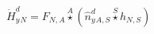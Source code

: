\documentclass[border=2pt]{standalone}
\begin{document}
${{\dot{H}^d_y}}{_{N}}={{F}}{_{N, A}} \stackrel{A}{\star} \left({{\hat{n}^{d}_y}}{_{A, S}} \stackrel{S}{\star} {h}{_{N, S}}\right)$
\end{document}

